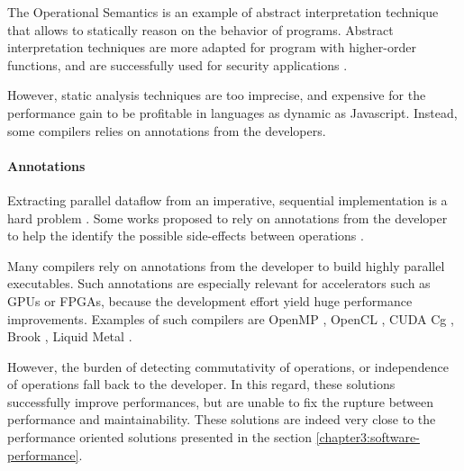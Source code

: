 The Operational Semantics is an example of abstract interpretation technique that allows to statically reason on the behavior of programs\cite{Maffeis2008,Smith2011,Gardner2012,Gardner2013,Bodin2014}.
Abstract interpretation techniques are more adapted for program with higher-order functions, and are successfully used for security applications \cite{Huang2004,Jovanovic2006,Yu2007,Maffeis2009a,Chudnov2015,Dolby2015}.

However, static analysis techniques are too imprecise, and expensive for the performance gain to be profitable in languages as dynamic as Javascript.
Instead, some compilers relies on annotations from the developers.

\paragraph{Annotations}

Extracting parallel dataflow from an imperative, sequential implementation is a hard problem \cite{Johnston2004a}.
Some works proposed to rely on annotations from the developer to help the identify the possible side-effects between operations \cite{Vandierendonck2010a,Fernandez2014a}.

Many compilers rely on annotations from the developer to build highly parallel executables.
Such annotations are especially relevant for accelerators such as GPUs or FPGAs, because the development effort yield huge performance improvements.
Examples of such compilers are OpenMP \cite{Dagum1998}, OpenCL \cite{Stone2010}, CUDA \cite{Nvidia2007} Cg \cite{Mark2003}, Brook \cite{Buck2004}, Liquid Metal \cite{Huang2008}.

However, the burden of detecting commutativity of operations, or independence of operations fall back to the developer.
In this regard, these solutions successfully improve performances, but are unable to fix the rupture between performance and maintainability.
These solutions are indeed very close to the performance oriented solutions presented in the section \ref{chapter3:software-performance}.


